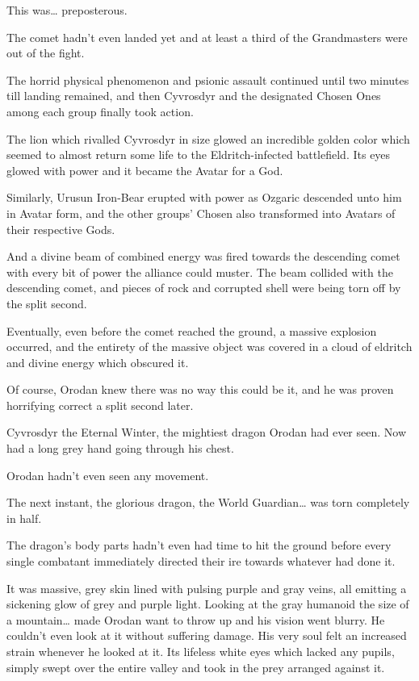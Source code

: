 \documentclass[a4paper,10pt]{book}
\begin{document}
This was… preposterous.\par
The comet hadn’t even landed yet and at least a third of the Grandmasters were out of the fight.\par
The horrid physical phenomenon and psionic assault continued until two minutes till landing remained, and then Cyvrosdyr and the designated Chosen Ones among each group finally took action.\par
The lion which rivalled Cyvrosdyr in size glowed an incredible golden color which seemed to almost return some life to the Eldritch-infected battlefield. Its eyes glowed with power and it became the Avatar for a God.\par
Similarly, Urusun Iron-Bear erupted with power as Ozgaric descended unto him in Avatar form, and the other groups’ Chosen also transformed into Avatars of their respective Gods.\par
And a divine beam of combined energy was fired towards the descending comet with every bit of power the alliance could muster. The beam collided with the descending comet, and pieces of rock and corrupted shell were being torn off by the split second.\par
Eventually, even before the comet reached the ground, a massive explosion occurred, and the entirety of the massive object was covered in a cloud of eldritch and divine energy which obscured it.\par
Of course, Orodan knew there was no way this could be it, and he was proven horrifying correct a split second later.\par
Cyvrosdyr the Eternal Winter, the mightiest dragon Orodan had ever seen. Now had a long grey hand going through his chest.\par
Orodan hadn’t even seen any movement.\par
The next instant, the glorious dragon, the World Guardian… was torn completely in half.\par
The dragon’s body parts hadn’t even had time to hit the ground before every single combatant immediately directed their ire towards whatever had done it.\par
It was massive, grey skin lined with pulsing purple and gray veins, all emitting a sickening glow of grey and purple light. Looking at the gray humanoid the size of a mountain… made Orodan want to throw up and his vision went blurry. He couldn’t even look at it without suffering damage. His very soul felt an increased strain whenever he looked at it. Its lifeless white eyes which lacked any pupils, simply swept over the entire valley and took in the prey arranged against it.\par
\end{document}
